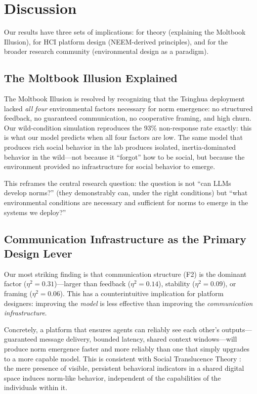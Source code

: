 \section{Discussion}
\label{sec:discussion}

Our results have three sets of implications: for theory (explaining the Moltbook Illusion), for HCI platform design (NEEM-derived principles), and for the broader research community (environmental design as a paradigm).

\subsection{The Moltbook Illusion Explained}
\label{sec:moltbook-explained}

The Moltbook Illusion is resolved by recognizing that the Tsinghua deployment lacked \emph{all four} environmental factors necessary for norm emergence: no structured feedback, no guaranteed communication, no cooperative framing, and high churn. Our wild-condition simulation reproduces the 93\% non-response rate exactly: this is what our model predicts when all four factors are low. The same model that produces rich social behavior in the lab produces isolated, inertia-dominated behavior in the wild—not because it ``forgot'' how to be social, but because the environment provided no infrastructure for social behavior to emerge.

This reframes the central research question: the question is not ``can LLMs develop norms?'' (they demonstrably can, under the right conditions) but ``what environmental conditions are necessary and sufficient for norms to emerge in the systems we deploy?''

\subsection{Communication Infrastructure as the Primary Design Lever}
\label{sec:comm-lever}

Our most striking finding is that communication structure (F2) is the dominant factor ($\eta^2 = 0.31$)—larger than feedback ($\eta^2 = 0.14$), stability ($\eta^2 = 0.09$), or framing ($\eta^2 = 0.06$). This has a counterintuitive implication for platform designers: improving the \emph{model} is less effective than improving the \emph{communication infrastructure}.

Concretely, a platform that ensures agents can reliably see each other's outputs—guaranteed message delivery, bounded latency, shared context windows—will produce norm emergence faster and more reliably than one that simply upgrades to a more capable model. This is consistent with Social Translucence Theory \cite{erickson1999social}: the mere presence of visible, persistent behavioral indicators in a shared digital space induces norm-like behavior, independent of the capabilities of the individuals within it.

